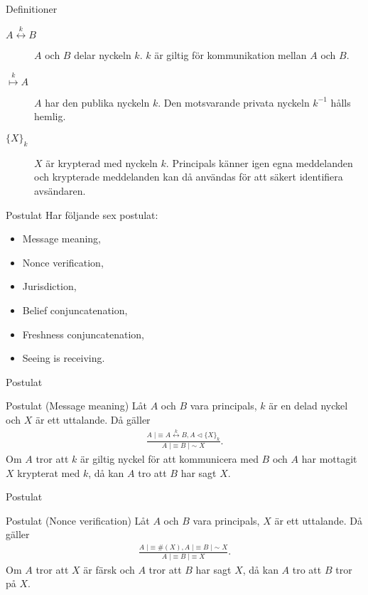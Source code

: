 \documentclass{beamer}
\theoremstyle{definition}
\newenvironment{axiom}[1]{\begin{block}{Postulat (#1)}}{\end{block}}
\theoremstyle{remark}
\DeclareMathOperator{\believes}{|\!\!\!\equiv}
\DeclareMathOperator{\said}{|\!\!\!\sim}
\DeclareMathOperator{\sees}{\lhd}
\newcommand{\fresh}[1]{\#(#1)}
\newcommand{\encrypt}[2]{\{#1\}_{#2}}
\newcommand{\share}[1]{\stackrel{#1}{\leftrightarrow}}
\newcommand{\pubkey}[1]{\stackrel{#1}{\mapsto}}
\begin{document}
\begin{frame}{\insertsubsectionhead}{Definitioner}
  \begin{description}
    \item[\(A\share{k} B\)] \(A\) och \(B\) delar nyckeln \(k\).
      \(k\) är giltig för kommunikation mellan \(A\) och \(B\).
    \item[\(\pubkey{k} A\)] \(A\) har den publika nyckeln \(k\).
      Den motsvarande privata nyckeln \(k^{-1}\) hålls hemlig.
    \item[\(\encrypt{X}{k}\)] \(X\) är krypterad med nyckeln \(k\).
      Principals känner igen egna meddelanden och krypterade meddelanden kan då 
      användas för att säkert identifiera avsändaren.
  \end{description}
\end{frame}

\begin{frame}{\insertsubsectionhead}{Postulat}
  Har följande sex postulat:
  \begin{itemize}
    \item Message meaning,
    \item Nonce verification,
    \item Jurisdiction,
    \item Belief conjuncatenation,
    \item Freshness conjuncatenation,
    \item Seeing is receiving.
  \end{itemize}
\end{frame}

\begin{frame}{\insertsubsectionhead}{Postulat}
  \begin{axiom}{Message meaning}
    Låt \(A\) och \(B\) vara principals, \(k\) är en delad nyckel och \(X\) är 
    ett uttalande.
    Då gäller
    \begin{align*}
      \frac{A\believes A\share{k} B, A\sees \encrypt{X}{k}}%
        {A\believes B\said X}.
    \end{align*}
    Om \(A\) tror att \(k\) är giltig nyckel för att kommunicera med \(B\) och 
    \(A\) har mottagit \(X\) krypterat med \(k\),
    då kan \(A\) tro att \(B\) har sagt \(X\).
  \end{axiom}
\end{frame}

\begin{frame}{\insertsubsectionhead}{Postulat}
  \begin{axiom}{Nonce verification}
    Låt \(A\) och \(B\) vara principals, \(X\) är ett uttalande.
    Då gäller
    \begin{align*}
      \frac{A\believes \fresh X, A\believes B\said X}%
        {A\believes B\believes X}.
    \end{align*}
    Om \(A\) tror att \(X\) är färsk och \(A\) tror att \(B\) har sagt \(X\),
    då kan \(A\) tro att \(B\) tror på \(X\).
  \end{axiom}
\end{frame}
\end{document}
